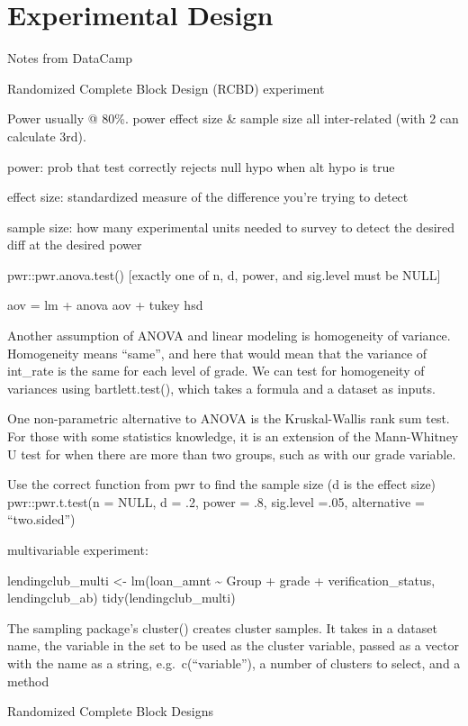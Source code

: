 \documentclass[]{book}
\begin{document}
\hypertarget{experimental-design}{%
\section{Experimental Design}\label{experimental-design}}

Notes from DataCamp

Randomized Complete Block Design (RCBD) experiment

Power usually @ 80\%. power effect size \& sample size all inter-related (with 2 can calculate 3rd).

power: prob that test correctly rejects null hypo when alt hypo is true

effect size: standardized measure of the difference you're trying to detect

sample size: how many experimental units needed to survey to detect the desired diff at the desired power

pwr::pwr.anova.test() {[}exactly one of n, d, power, and sig.level must be NULL{]}

aov = lm + anova \textbar{} aov + tukey hsd

Another assumption of ANOVA and linear modeling is homogeneity of variance. Homogeneity means ``same'', and here that would mean that the variance of int\_rate is the same for each level of grade. We can test for homogeneity of variances using bartlett.test(), which takes a formula and a dataset as inputs.

One non-parametric alternative to ANOVA is the Kruskal-Wallis rank sum test. For those with some statistics knowledge, it is an extension of the Mann-Whitney U test for when there are more than two groups, such as with our grade variable.

Use the correct function from pwr to find the sample size (d is the effect size)
pwr::pwr.t.test(n = NULL, d = .2, power = .8, sig.level =.05, alternative = ``two.sided'')

multivariable experiment:

lendingclub\_multi \textless{}- lm(loan\_amnt \textasciitilde{} Group + grade + verification\_status, lendingclub\_ab)
tidy(lendingclub\_multi)

The sampling package's cluster() creates cluster samples. It takes in a dataset name, the variable in the set to be used as the cluster variable, passed as a vector with the name as a string, e.g.~c(``variable''), a number of clusters to select, and a method

Randomized Complete Block Designs
\end{document}
